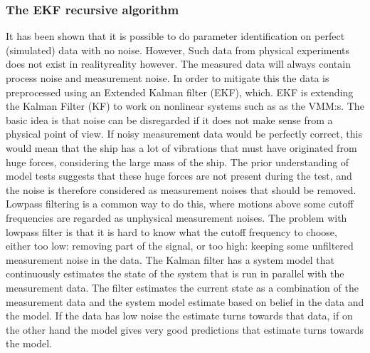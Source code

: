 \documentclass[review]{elsarticle}
\begin{document}
\subsubsection{The EKF recursive algorithm}
\label{\detokenize{04.01_EK:the-ekf-recursive-algorithm}}
\sphinxAtStartPar
It has been shown that it is possible to do parameter identification on perfect (simulated) data with no noise. However, Such data from physical experiments does not exist in realityreality however. The measured data will always contain process noise and measurement noise. In order to mitigate this the data is pre\sphinxhyphen{}processed using an Extended Kalman filter (EKF), which. EKF  is extending the Kalman Filter (KF) to work on nonlinear systems such as as the VMM:s. The basic idea is that noise can be disregarded if it does not make sense from a physical point of view. If noisy measurement data would be perfectly correct, this would mean that the ship has a lot of vibrations that must have originated from huge forces, considering the large mass of the ship. The prior understanding of model tests suggests that these huge forces are not present during the test, and the noise is therefore considered as measurement noises that should be removed. Lowpass filtering is a common way to do this, where motions above some cut\sphinxhyphen{}off frequencies are regarded as unphysical measurement noises. The problem with lowpass filter is that it is hard to know what the cut\sphinxhyphen{}off frequency to choose, either too low: removing part of the signal, or too high: keeping some unfiltered measurement noise in the data. The Kalman filter has a system model that continuously estimates the state of the system that is run in parallel with the measurement data. The filter estimates the current state as a combination of the measurement data and the system model estimate based on belief in the data and the model. If the data has low noise the estimate turns towards that data, if on the other hand the model gives very good predictions that estimate turns towards the model.
\end{document}
